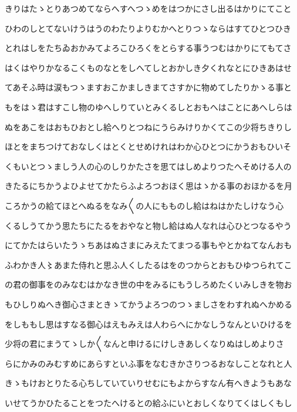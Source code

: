 \documentclass[a4paper,11pt,landscape]{ltjtarticle}
\begin{document}
きりはたゝとりあつめてならへすへつゝめをはつかにさし出るはかりにてこと
\par\medskip
ひわのしとてないけうはうのわたりよりむかへとりつゝならはすてひとつひき
\par\medskip
とれはしをたちゐおかみてよろこひろくをとらする事うつむはかりにてもてさ
\par\medskip
はくはやりかなるこくものなとをしへてしとおかしき夕くれなとにひきあはせ
\par\medskip
てあそふ時は涙もつゝますおこかましきまてさすかに物めてしたりかゝる事と
\par\medskip
もをはゝ君はすこし物のゆへしりていとみくるしとおもへはことにあへしらは
\par\medskip
ぬをあこをはおもひおとし給へりとつねにうらみけりかくてこの少将ちきりし
\par\medskip
ほとをまちつけておなしくはとくとせめけれはわか心ひとつにかうおもひいそ
\par\medskip
くもいとつゝましう人の心のしりかたさを思てはしめよりつたへそめける人の
\par\medskip
きたるにちかうよひよせてかたらふよろつおほく思はゝかる事のおほかるを月
\par\medskip
ころかうの給てほとへぬるをなみ〱の人にもものし給はねはかたしけなう心
\par\medskip
くるしうてかう思たちにたるをおやなと物し給はぬ人なれは心ひとつなるやう
\par\medskip
にてかたはらいたうゝちあはぬさまにみえたてまつる事もやとかねてなんおも
\par\medskip
ふわかき人〻あまた侍れと思ふ人くしたるはをのつからとおもひゆつられてこ
\par\medskip
の君の御事をのみなむはかなき世の中をみるにもうしろめたくいみしきを物お
\par\medskip
もひしりぬへき御心さまときゝてかうよろつのつゝましさをわすれぬへかめる
\par\medskip
をしももし思はすなる御心はえもみえは人わらへにかなしうなんといひけるを
\par\medskip
少将の君にまうてゝしか〱なんと申けるにけしきあしくなりぬはしめよりさ
\par\medskip
らにかみのみむすめにあらすといふ事をなむきかさりつるおなしことなれと人
\par\medskip
きゝもけおとりたる心ちしていていりせむにもよからすなん有へきようもあな
\par\medskip
いせてうかひたることをつたへけるとの給ふにいとおしくなりてくはしくもし
\par\medskip
\end{document}

